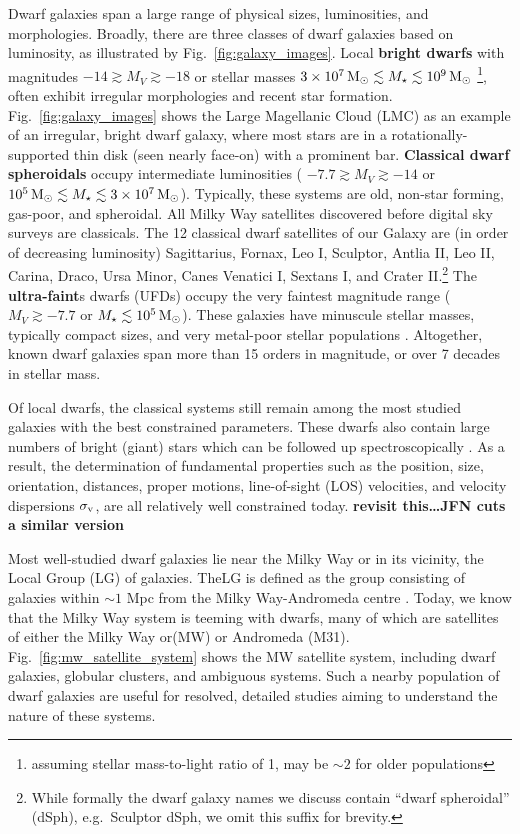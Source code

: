 Dwarf galaxies span a large range of physical sizes, luminosities, and
morphologies. Broadly, there are three classes of dwarf galaxies based
on luminosity, as illustrated by Fig.~\ref{fig:galaxy_images}. Local
\textbf{bright dwarfs} with magnitudes \(-14 \gtrsim M_V \gtrsim  -18\)
or stellar masses
\(3\times10^7\,{\rm M}_{\odot} \lesssim M_\star \lesssim 10^9\,{\rm M}_{\odot}\) \footnote{assuming
  stellar mass-to-light ratio of 1, may be \(\sim 2\) for older
  populations}, often exhibit irregular morphologies and recent star
formation. Fig.~\ref{fig:galaxy_images} shows the Large Magellanic Cloud
(LMC) as an example of an irregular, bright dwarf galaxy, where most
stars are in a rotationally-supported thin disk (seen nearly face-on)
with a prominent bar. \textbf{Classical dwarf spheroidals} occupy
intermediate luminosities ( \(-7.7 \gtrsim M_V  \gtrsim -14\) or
\(10^5\,{\rm M}_{\odot} \lesssim M_\star \lesssim 3\times10^7\,{\rm M}_{\odot}\)). Typically,
these systems are old, non-star forming, gas-poor, and spheroidal. All
Milky Way satellites discovered before digital sky surveys are
classicals. The 12 classical dwarf satellites of our Galaxy are (in
order of decreasing luminosity) Sagittarius, Fornax, Leo I, Sculptor,
Antlia II, Leo II, Carina, Draco, Ursa Minor, Canes Venatici I, Sextans
I, and Crater II.\footnote{While formally the dwarf galaxy names we
  discuss contain ``dwarf spheroidal'' (dSph), e.g.~Sculptor dSph, we
  omit this suffix for brevity.} The \textbf{ultra-faint}s dwarfs (UFDs)
occupy the very faintest magnitude range (\(M_V \gtrsim -7.7\) or
\(M_\star \lesssim 10^5\,{\rm M}_{\odot}\)). These galaxies have minuscule stellar
masses, typically compact sizes, and very metal-poor stellar populations
\citep[see review][]{simon2019}. Altogether, known dwarf galaxies span
more than 15 orders in magnitude, or over 7 decades in stellar mass.

Of local dwarfs, the classical systems still remain among the most
studied galaxies with the best constrained parameters. These dwarfs also
contain large numbers of bright (giant) stars which can be followed up
spectroscopically \citep[e.g.,][]{tolstoy+2023, pace+2020}. As a result,
the determination of fundamental properties such as the position, size,
orientation, distances, proper motions, line-of-sight (LOS) velocities,
and velocity dispersions \(\sigma_{\rm v}\), are all relatively well
constrained today. \textbf{revisit this\ldots JFN cuts a similar
version}

Most well-studied dwarf galaxies lie near the Milky Way or in its
vicinity, the Local Group (LG) of galaxies. TheLG is defined as the
group consisting of galaxies within \(\sim 1\) Mpc from the Milky
Way-Andromeda centre \citep[e.g.,][ and references
therein]{mcconnachie2012}. Today, we know that the Milky Way system is
teeming with dwarfs, many of which are satellites of either the Milky
Way or(MW) or Andromeda (M31). Fig.~\ref{fig:mw_satellite_system} shows
the MW satellite system, including dwarf galaxies, globular clusters,
and ambiguous systems. Such a nearby population of dwarf galaxies are
useful for resolved, detailed studies aiming to understand the nature of
these systems.

